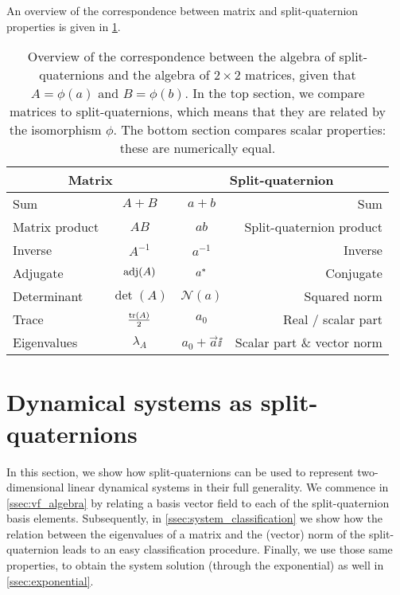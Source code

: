 An overview of the correspondence between matrix and split-quaternion properties is given in \cref{tab:spquat_matrices}.


\renewcommand{\arraystretch}{1.3}
\begin{table}[ht!]
    \centering
    \caption{Overview of the correspondence between the algebra of split-quaternions and the algebra of \(2\times2\) matrices, given that \(A = \phi(a)\) and \(B = \phi(b)\). In the top section, we compare matrices to split-quaternions, which means that they are related by the isomorphism \(\phi\). The bottom section compares scalar properties: these are numerically equal.}
    \label{tab:spquat_matrices}
    \begin{tabular}{lc|cr}
    \toprule
        \multicolumn{2}{c}{\textbf{Matrix}} & \multicolumn{2}{c}{\textbf{Split-quaternion}} \\
    \midrule
        Sum      & \( A + B \)      & \( a + b\) & Sum \\
        Matrix product  & \( AB \)  & \( ab\) & Split-quaternion product \\
        Inverse  & \(A^{-1}\)       & \(a^{-1}\) & Inverse \\
        Adjugate & \(\operatorname{adj}(A)\) & \(a^*\) & Conjugate \\
        \midrule
        Determinant & \(\det(A)\) & \(\mathscr{N}(a)\) & Squared norm \\
        Trace       & \(\frac{\trace(A)}{2}\) & \(a_0\) & Real / scalar part \\
        Eigenvalues \hspace{1.5cm} & \(\lambda_{A} \) & \( a_0 + \vec{a}\ii \) & Scalar part \& vector norm \\
    \bottomrule
    \end{tabular}
\end{table}
\renewcommand{\arraystretch}{1}

\section{Dynamical systems as split-quaternions}
\label{sec:system_classification}
In this section, we show how split-quaternions can be used to represent two-dimensional linear dynamical systems in their full generality. We commence in \cref{ssec:vf_algebra} by relating a basis vector field to each of the split-quaternion basis elements. Subsequently, in \cref{ssec:system_classification} we show how the relation between the eigenvalues of a matrix and the (vector) norm of the split-quaternion leads to an easy classification procedure. Finally, we use those same properties, to obtain the system solution (through the exponential) as well in \cref{ssec:exponential}.


